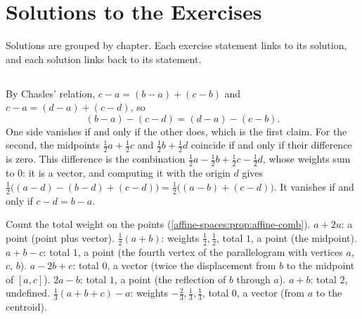 \chapter{Solutions to the Exercises}\label{ch:solutions}

Solutions are grouped by chapter. Each exercise statement links to its
solution, and each solution links back to its statement.

\section{}

By Chasles' relation, $c - a = (b - a) + (c - b)$ and
$c - a = (d - a) + (c - d)$, so
\[
  (b - a) - (c - d) = (d - a) - (c - b) .
\]
One side vanishes if and only if the other does, which is the first claim.
For the second, the midpoints $\frac12a + \frac12c$ and $\frac12b + \frac12d$
coincide if and only if their difference is zero. This difference is the
combination $\frac12a - \frac12b + \frac12c - \frac12d$, whose weights sum
to $0$: it is a vector, and computing it with the origin $d$ gives
$\frac12\bigl((a - d) - (b - d) + (c - d)\bigr)
= \frac12\bigl((a - b) + (c - d)\bigr)$. It vanishes if and only if
$c - d = b - a$.

Count the total weight on the points
(\cref{affine-spaces:prop:affine-comb}).
$a + 2u$: a point (point plus vector).
$\frac12(a + b)$: weights $\frac12, \frac12$, total $1$, a point (the
midpoint).
$a + b - c$: total $1$, a point (the fourth vertex of the parallelogram
with vertices $a$, $c$, $b$).
$a - 2b + c$: total $0$, a vector (twice the displacement from $b$ to the
midpoint of $[a, c]$).
$2a - b$: total $1$, a point (the reflection of $b$ through $a$).
$a + b$: total $2$, undefined.
$\frac13(a + b + c) - a$: weights $-\frac23, \frac13, \frac13$, total $0$, a
vector (from $a$ to the centroid).

